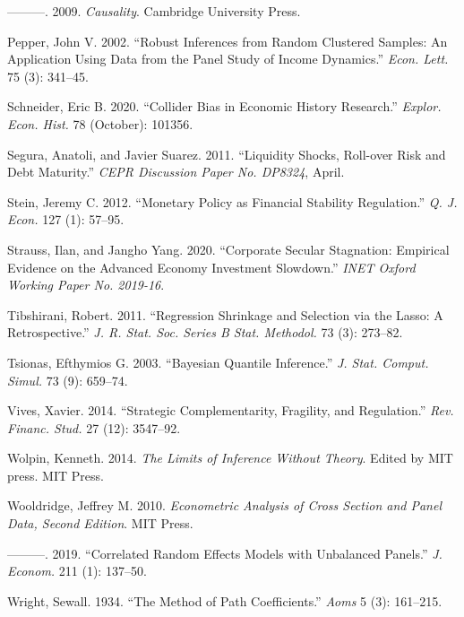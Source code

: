 \documentclass[
  10pt,
]{article}
\begin{document}
\leavevmode\hypertarget{ref-Pearl2009}{}%
---------. 2009. \emph{Causality}. Cambridge University Press.

\leavevmode\hypertarget{ref-Pepper2002}{}%
Pepper, John V. 2002. ``Robust Inferences from Random Clustered Samples:
An Application Using Data from the Panel Study of Income Dynamics.''
\emph{Econ. Lett.} 75 (3): 341--45.

\leavevmode\hypertarget{ref-Schneider2020}{}%
Schneider, Eric B. 2020. ``Collider Bias in Economic History Research.''
\emph{Explor. Econ. Hist.} 78 (October): 101356.

\leavevmode\hypertarget{ref-Segura2011}{}%
Segura, Anatoli, and Javier Suarez. 2011. ``Liquidity Shocks, Roll-over
Risk and Debt Maturity.'' \emph{CEPR Discussion Paper No. DP8324},
April.

\leavevmode\hypertarget{ref-Stein2012}{}%
Stein, Jeremy C. 2012. ``Monetary Policy as Financial Stability
Regulation.'' \emph{Q. J. Econ.} 127 (1): 57--95.

\leavevmode\hypertarget{ref-Strauss2020}{}%
Strauss, Ilan, and Jangho Yang. 2020. ``Corporate Secular Stagnation:
Empirical Evidence on the Advanced Economy Investment Slowdown.''
\emph{INET Oxford Working Paper No. 2019-16}.

\leavevmode\hypertarget{ref-Tibshirani2011}{}%
Tibshirani, Robert. 2011. ``Regression Shrinkage and Selection via the
Lasso: A Retrospective.'' \emph{J. R. Stat. Soc. Series B Stat.
Methodol.} 73 (3): 273--82.

\leavevmode\hypertarget{ref-Tsionas2003}{}%
Tsionas, Efthymios G. 2003. ``Bayesian Quantile Inference.'' \emph{J.
Stat. Comput. Simul.} 73 (9): 659--74.

\leavevmode\hypertarget{ref-Vives2014}{}%
Vives, Xavier. 2014. ``Strategic Complementarity, Fragility, and
Regulation.'' \emph{Rev. Financ. Stud.} 27 (12): 3547--92.

\leavevmode\hypertarget{ref-Wolpin2014}{}%
Wolpin, Kenneth. 2014. \emph{The Limits of Inference Without Theory}.
Edited by MIT press. MIT Press.

\leavevmode\hypertarget{ref-Wooldridge2010}{}%
Wooldridge, Jeffrey M. 2010. \emph{Econometric Analysis of Cross Section
and Panel Data, Second Edition}. MIT Press.

\leavevmode\hypertarget{ref-Wooldridge2019}{}%
---------. 2019. ``Correlated Random Effects Models with Unbalanced
Panels.'' \emph{J. Econom.} 211 (1): 137--50.

\leavevmode\hypertarget{ref-Wright1934}{}%
Wright, Sewall. 1934. ``The Method of Path Coefficients.'' \emph{Aoms} 5
(3): 161--215.
\end{document}
